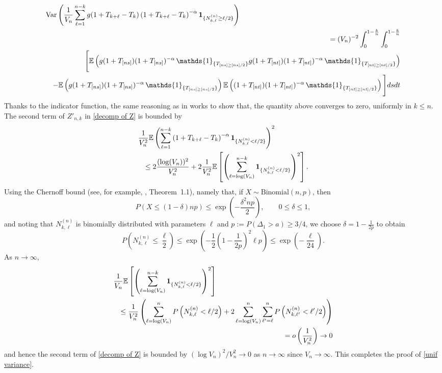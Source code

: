 \documentclass[preprint,12pt]{article}
\newcommand{\ind}[1]{\,\mathds{1}_{\{#1\}}}
\begin{document}
\begin{eqnarray*}\lefteqn{
\textrm{Var}\left(\frac{1}{V_n}
\sum_{\ell=1}^{n-k}
g(1+T_{k+\ell}-T_k)\left(1+T_{k+\ell}-T_k\right)^{-\alpha}
\mathbf 1_{\{N_{k,\ell}^{(n)}\ge\ell/2\}}\right)}\\
&&
=(V_n)^{-2}\int_0^{1-\frac{k}{n}}\int_0^{1-\frac{k}{n}}\\
&&\Bigg[\mathbb{E}\left(g(1+T_{[ns]})(1+T_{[ns]})^{-\alpha}\ind{T_{[ns]\ge[ns]/2}}g(1+T_{[nt]})(1+T_{[nt]})^{-\alpha}\ind{T_{[nt]\ge[nt]/2}}\right)\\
&&-\mathbb{E}\left(g(1+T_{[ns]})(1+T_{[ns]})^{-\alpha}\ind{T_{[ns]\ge[ns]/2}}\right)\mathbb{E}\left((1+T_{[nt]})(1+T_{[nt]})^{-\alpha}\ind{T_{[nt]\ge[nt]/2}}\right)\Bigg]dsdt
\end{eqnarray*}
Thanks to the indicator function, the same reasoning as in \cite{ouldhaye2024asymptoticsirregularlyobservedlong} works
to show that, the quantity above converges to zero, uniformly in $k\le n$.  The second term of $Z'_{n,k}$ in \eqref{decomp of Z} is bounded by
\begin{eqnarray*}
\lefteqn{
\frac{1}{V^2_n}
\mathbb{E}
\left(
\sum_{\ell=1}^{n-k}
\left(1+T_{k+\ell}-T_k\right)^{-\alpha}
\mathbf 1_{\{N_{k,\ell}^{(n)}<\ell/2\}}
\right)^2
}\\
&&\le
2\frac{(\log(V_n))^2}{V^2_n}
+
2\frac{1}{V^2_n}
\mathbb{E}
\left[
\left(
\sum_{\ell=\log(V_n)}^{n-k}
\mathbf 1_{\{N_{k,\ell}^{(n)}<\ell/2\}}
\right)^2
\right].
\end{eqnarray*}
Using the Chernoff bound (see, for example, \cite{DubhashiPanconesi2009}, Theorem~1.1), namely that, if $X\sim\mathrm{Binomial}(n,p)$, then
\[
P(X\le (1-\delta)np)\le \exp\left(-\frac{\delta^2np}{2}\right),\qquad 0\le\delta\le1,
\]
and noting that $N_{k,\ell}^{(n)}$ is binomially distributed with parameters $\ell$ and $p:=P(\Delta_1>a)\ge3/4$, we choose $\delta=1-\frac{1}{2p}$ to obtain
\[
P\left(N_{k,\ell}^{(n)}\le \frac{\ell}{2}\right)
\le
\exp\left(-\frac12\left(1-\frac{1}{2p}\right)^2\ell p\right)
\le
\exp\left(-\frac{\ell}{24}\right).
\]
As $n\to\infty$,
\begin{eqnarray*}
\lefteqn{
\frac{1}{V_n}
\mathbb{E}
\left[
\left(
\sum_{\ell=\log(V_n)}^{n-k}
\mathbf 1_{\{N_{k,\ell}^{(n)}<\ell/2\}}
\right)^2
\right]
}\\
&&\le
\frac{1}{V^2_n}
\left(
\sum_{\ell=\log(V_n)}^{n}
P\left(N_{k,\ell}^{(n)}<\ell/2\right)
+
2\sum_{\ell=\log(V_n)}^{n}
\sum_{\ell'=\ell}^{n}
P\left(N_{k,\ell'}^{(n)}<\ell'/2\right)
\right)\\
&&=
o\left(
\frac{1}{V^2_n}
\right)
\to0
\end{eqnarray*}
and hence the second term of \eqref{decomp of Z} is bounded by $(\log V_n)^2/V_n^2\to0$ as $n\to\infty$ since $V_n\to\infty.$
This completes the proof of \eqref{unif variance}.
\end{document}
